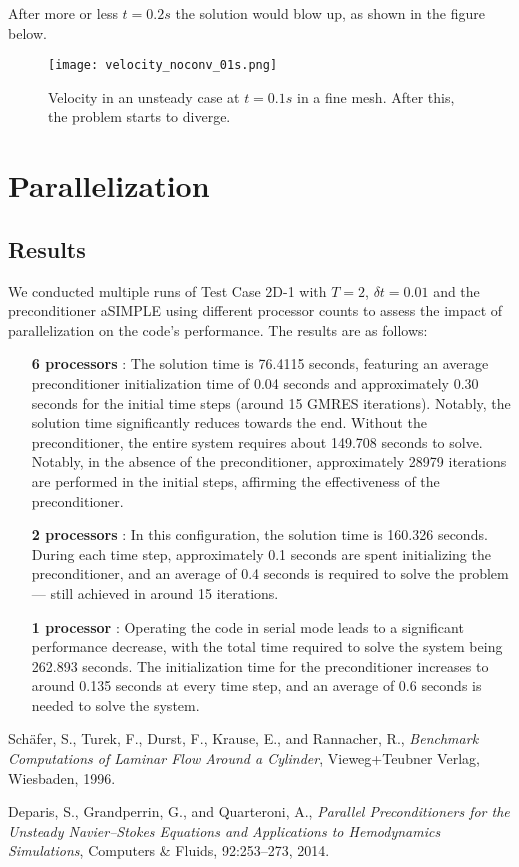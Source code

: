 \documentclass{article}
\begin{document}
After more or less \(t=0.2s\) the solution would blow up, as shown in the figure below.

\begin{figure}[h]
    \centering
    \texttt{[image: velocity\_noconv\_01s.png]}
    \caption{Velocity in an unsteady case at \(t=0.1s\) in a fine mesh. After this, the problem starts to diverge.}
\end{figure}

\section{Parallelization}

\subsection*{Results}
We conducted multiple runs of Test Case 2D-1 with \(T = 2\), \(\delta t = 0.01\) and the preconditioner aSIMPLE using different processor counts to assess the impact of parallelization on the code's performance. The results are as follows:

\begin{itemize}
    \item [\textbf{6 processors}]: The solution time is 76.4115 seconds, featuring an average preconditioner initialization time of 0.04 seconds and approximately 0.30 seconds for the initial time steps (around 15 GMRES iterations). Notably, the solution time significantly reduces towards the end. Without the preconditioner, the entire system requires about 149.708 seconds to solve. Notably, in the absence of the preconditioner, approximately 28979 iterations are performed in the initial steps, affirming the effectiveness of the preconditioner.

    \item[\textbf{2 processors}]: In this configuration, the solution time is 160.326 seconds. During each time step, approximately 0.1 seconds are spent initializing the preconditioner, and an average of 0.4 seconds is required to solve the problem — still achieved in around 15 iterations.

    \item[\textbf{1 processor}]: Operating the code in serial mode leads to a significant performance decrease, with the total time required to solve the system being 262.893 seconds. The initialization time for the preconditioner increases to around 0.135 seconds at every time step, and an average of 0.6 seconds is needed to solve the system.
\end{itemize}




\begin{thebibliography}{99}
  Schäfer, S., Turek, F., Durst, F., Krause, E., and Rannacher, R.,
  \emph{Benchmark Computations of Laminar Flow Around a Cylinder},
  Vieweg+Teubner Verlag,
  Wiesbaden,
  1996.

  Deparis, S., Grandperrin, G., and Quarteroni, A.,
  \emph{Parallel Preconditioners for the Unsteady Navier–Stokes Equations and Applications to Hemodynamics Simulations},
  Computers \& Fluids,
  92:253–273,
  2014.
\end{thebibliography}
\end{document}
